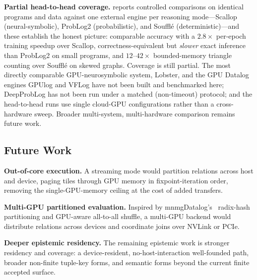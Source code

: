 \textbf{Partial head-to-head coverage.}  reports controlled comparisons on identical programs and data against one external engine per reasoning mode---Scallop (neural-symbolic), ProbLog2 (probabilistic), and Soufflé (deterministic)---and these establish the honest picture: comparable accuracy with a $2.8\times$ per-epoch training speedup over Scallop, correctness-equivalent but \emph{slower} exact inference than ProbLog2 on small programs, and $12$--$42\times$ bounded-memory triangle counting over Soufflé on skewed graphs. Coverage is still partial. The most directly comparable GPU-neurosymbolic system, Lobster, and the GPU Datalog engines GPUlog and VFLog have not been built and benchmarked here; DeepProbLog has not been run under a matched (non-timeout) protocol; and the head-to-head runs use single cloud-GPU configurations rather than a cross-hardware sweep. Broader multi-system, multi-hardware comparison remains future work.

\subsection{Future Work}

\textbf{Out-of-core execution.} A streaming mode would partition relations across host and device, paging tiles through GPU memory in fixpoint-iteration order, removing the single-GPU-memory ceiling at the cost of added transfers.

\textbf{Multi-GPU partitioned evaluation.} Inspired by mnmgDatalog's~\cite{mnmgdatalog} radix-hash partitioning and GPU-aware all-to-all shuffle, a multi-GPU backend would distribute relations across devices and coordinate joins over NVLink or PCIe.

\textbf{Deeper epistemic residency.} The remaining epistemic work is stronger residency and coverage: a device-resident, no-host-interaction well-founded path, broader non-finite tuple-key forms, and semantic forms beyond the current finite accepted surface.
